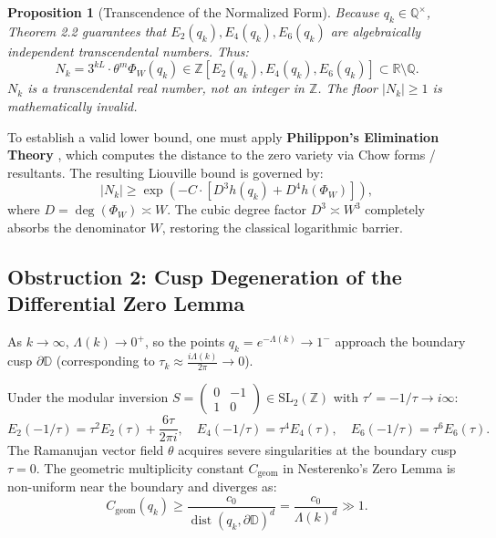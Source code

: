 \documentclass[11pt,reqno]{amsart}
\newtheorem{proposition}[theorem]{Proposition}
\theoremstyle{definition}
\numberwithin{equation}{section}
\begin{document}
\begin{proposition}[Transcendence of the Normalized Form]
Because $q_k \in \mathbb{Q}^\times$, Theorem 2.2 guarantees that $E_2(q_k), E_4(q_k), E_6(q_k)$ are algebraically independent transcendental numbers. Thus:
\begin{equation}
N_k = 3^{k L} \cdot \theta^m \Phi_W(q_k) \in \mathbb{Z}[E_2(q_k), E_4(q_k), E_6(q_k)] \subset \mathbb{R} \setminus \mathbb{Q}.
\end{equation}
$N_k$ is a transcendental real number, not an integer in $\mathbb{Z}$. The floor $|N_k| \ge 1$ is mathematically invalid.
\end{proposition}

To establish a valid lower bound, one must apply \textbf{Philippon's Elimination Theory} \cite{philippon1986}, which computes the distance to the zero variety via Chow forms / resultants. The resulting Liouville bound is governed by:
\begin{equation}
|N_k| \ge \exp\left( - C \cdot \left[ D^3 h(q_k) + D^4 h(\Phi_W) \right] \right),
\end{equation}
where $D = \deg(\Phi_W) \asymp W$. The cubic degree factor $D^3 \asymp W^3$ completely absorbs the denominator $W$, restoring the classical logarithmic barrier.

\subsection{Obstruction 2: Cusp Degeneration of the Differential Zero Lemma}
As $k \to \infty$, $\Lambda(k) \to 0^+$, so the points $q_k = e^{-\Lambda(k)} \to 1^-$ approach the boundary cusp $\partial \mathbb{D}$ (corresponding to $\tau_k \approx \frac{i \Lambda(k)}{2\pi} \to 0$).

Under the modular inversion $S = \begin{pmatrix} 0 & -1 \\ 1 & 0 \end{pmatrix} \in \mathrm{SL}_2(\mathbb{Z})$ with $\tau' = -1/\tau \to i\infty$:
\begin{equation}
E_2(-1/\tau) = \tau^2 E_2(\tau) + \frac{6\tau}{2\pi i}, \quad E_4(-1/\tau) = \tau^4 E_4(\tau), \quad E_6(-1/\tau) = \tau^6 E_6(\tau).
\end{equation}
The Ramanujan vector field $\theta$ acquires severe singularities at the boundary cusp $\tau = 0$. The geometric multiplicity constant $C_{\mathrm{geom}}$ in Nesterenko's Zero Lemma is non-uniform near the boundary and diverges as:
\begin{equation}
C_{\mathrm{geom}}(q_k) \ge \frac{c_0}{\operatorname{dist}(q_k, \partial \mathbb{D})^d} = \frac{c_0}{\Lambda(k)^d} \gg 1.
\end{equation}
\end{document}
